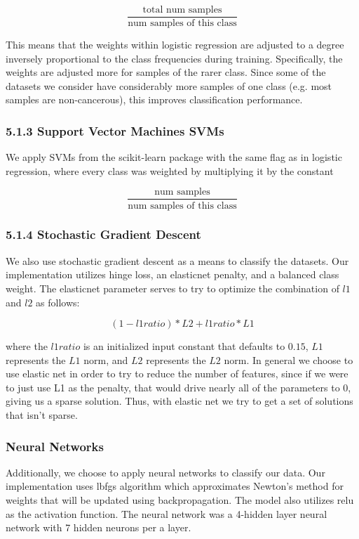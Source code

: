 \documentclass[12pt]{scrartcl}
\begin{document}
    $$\frac{\textrm{total num samples}}{\textrm{num samples of this class}}$$
    
    This means that the weights within logistic regression are adjusted to a degree inversely proportional to the class frequencies during training. Specifically, the weights are adjusted more for samples of the rarer class. Since some of the datasets we consider have considerably more samples of one class (e.g. most samples are non-cancerous), this improves classification performance.
    
    \subsubsection*{5.1.3 Support Vector Machines SVMs}
    We apply SVMs from the scikit-learn package with the same flag as in logistic regression, where every class was weighted by multiplying it by the constant
    
    $$\frac{\textrm{num samples}}{\textrm{num samples of this class}}$$
    
    \subsubsection*{5.1.4 Stochastic Gradient Descent}
    We also use stochastic gradient descent as a means to classify the datasets. Our implementation utilizes hinge loss, an elasticnet penalty, and a balanced class weight. The elasticnet parameter serves to try to optimize the combination of $l1$ and $l2$ as follows:
    
    $$(1-l1ratio)*L2 +l1ratio*L1$$
    
    where the $l1ratio$ is an initialized input constant that defaults to $0.15$, $L1$ represents the $L1$ norm, and $L2$ represents the $L2$ norm. In general we choose to use elastic net in order to try to reduce the number of features, since if we were to just use L1 as the penalty, that would drive nearly all of the parameters to $0$, giving us a sparse solution. Thus, with elastic net we try to get a set of solutions that isn't sparse.
    
    \subsubsection{Neural Networks}
    Additionally, we choose to apply neural networks to classify our data. Our implementation uses lbfgs algorithm which approximates Newton's method for weights that will be updated using backpropagation. The model also utilizes relu as the activation function. The neural network was a 4-hidden layer neural network with 7 hidden neurons per a layer. 
    
\end{document}
